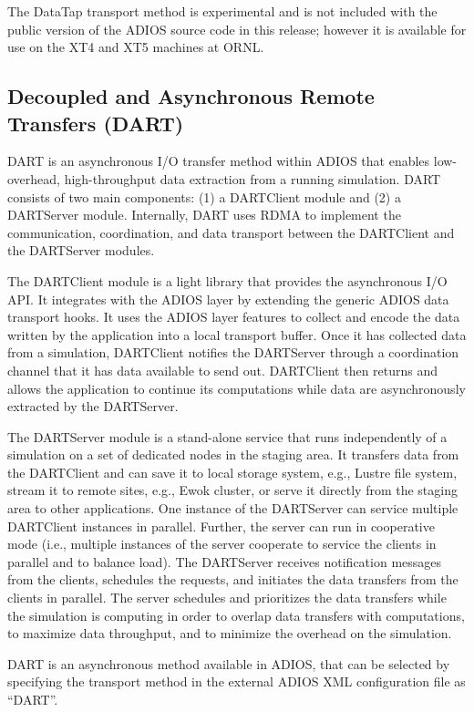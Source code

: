The DataTap transport method is experimental and is not included with the public 
version of the ADIOS source code in this release; however it is available for use 
on the XT4 and XT5 machines at ORNL.

\subsection{Decoupled and Asynchronous Remote Transfers (DART)}

DART is an asynchronous I/O transfer method within ADIOS that enables low-overhead, 
high-throughput data extraction from a running simulation. DART consists of two 
main components: (1) a DARTClient module and (2) a DARTServer module. Internally, 
DART uses RDMA to implement the communication, coordination, and data transport 
between the DARTClient and the DARTServer modules.

The DARTClient module is a light library that provides the asynchronous I/O API. 
It integrates with the ADIOS layer by extending the generic ADIOS data transport 
hooks. It uses the ADIOS layer features to collect and encode the data written 
by the application into a local transport buffer. Once it has collected data from 
a simulation, DARTClient notifies the DARTServer through a coordination channel 
that it has data available to send out. DARTClient then returns and allows the 
application to continue its computations while data are asynchronously extracted 
by the DARTServer.

The DARTServer module is a stand-alone service that runs independently of a simulation 
on a set of dedicated nodes in the staging area. It transfers data from the DARTClient 
and can save it to local storage system, e.g., Lustre file system, stream it to 
remote sites, e.g., Ewok cluster, or serve it directly from the staging area to 
other applications. One instance of the DARTServer can service multiple DARTClient 
instances in parallel. Further, the server can run in cooperative mode (i.e., multiple 
instances of the server cooperate to service the clients in parallel and to balance 
load). The DARTServer receives notification messages from the clients, schedules 
the requests, and initiates the data transfers from the clients in parallel. The 
server schedules and prioritizes the data transfers while the simulation is computing 
in order to overlap data transfers with computations, to maximize data throughput, 
and to minimize the overhead on the simulation.

DART is an asynchronous method available in ADIOS, that can be selected by specifying 
the transport method in the external ADIOS XML configuration file as ``DART''.

